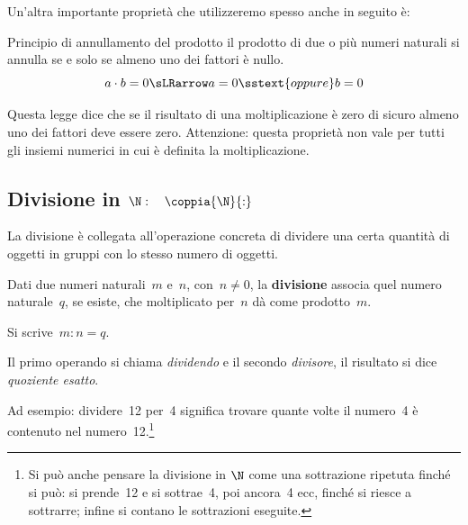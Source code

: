 \bigskip %
Un'altra importante proprietà che utilizzeremo spesso anche in seguito è:

\begin{postulato}{Principio di annullamento del prodotto}{}
il prodotto di due o più numeri naturali si annulla se e solo se almeno uno 
dei fattori è nullo.
\[ a \cdot b = 0 \sLRarrow a=0 \sstext{oppure} b = 0\]
\end{postulato}

Questa legge dice che se il risultato di una moltiplicazione è zero di 
sicuro almeno uno dei fattori deve essere zero. 
Attenzione: questa proprietà non vale per tutti gli insiemi numerici in 
cui è definita la moltiplicazione.

\subsection{Divisione in 
\texorpdfstring{$\N: \quad \coppia{\N}{:}$}{N: (N; :)}}

La divisione è collegata all'operazione concreta di dividere una certa
quantità di oggetti in gruppi con lo stesso numero di oggetti.

\begin{definizione}{}{}
Dati due numeri naturali~\(m\) e~\(n\), con~\(n \neq 0\), la 
\textbf{divisione} associa quel numero naturale~\(q\), se esiste, che 
moltiplicato per~\(n\) dà come prodotto~\(m\).

Si scrive~\(m : n = q\).

Il primo operando si chiama \emph{dividendo} e il secondo \emph{divisore}, 
il risultato si dice \emph{quoziente esatto}.
\end{definizione}

Ad esempio: dividere~12 per~4 significa trovare quante volte il numero~4 è 
contenuto nel numero~12.\footnote{Si può anche pensare la divisione in 
\(\N\) come una sottrazione ripetuta finché si può: si prende~12 e si 
sottrae~4, poi ancora~4 ecc,  finché si riesce a sottrarre; infine si 
contano le sottrazioni eseguite.}

\vspace{.5em}

